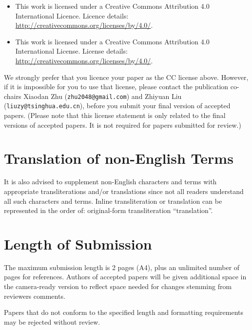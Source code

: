 \documentclass[11pt]{article}
\begin{document}
\begin{itemize}
    \item  This work is licensed under a Creative Commons Attribution 4.0 International Licence. Licence details: \url{http://creativecommons.org/licenses/by/4.0/}.
           
    \item This work is licensed under a Creative Commons Attribution 4.0 International License. License details: \url{http://creativecommons.org/licenses/by/4.0/}.
           
           
           
\end{itemize}

We strongly prefer that you licence your paper as the CC license
above. However, if it is impossible for you to use that license, please 
contact the publication co-chairs Xiaodan Zhu
(\texttt{zhu2048@gmail.com}) and Zhiyuan Liu (\texttt{liuzy@tsinghua.edu.cn}),
before you submit your final version of accepted papers. 
(Please note that this license statement is only related to the final versions of accepted papers. 
It is not required for papers submitted for review.)

\section{Translation of non-English Terms}

It is also advised to supplement non-English characters and terms
with appropriate transliterations and/or translations
since not all readers understand all such characters and terms.
Inline transliteration or translation can be represented in
the order of: original-form transliteration ``translation''.

\section{Length of Submission}
\label{sec:length}

The maximum submission length is 2 pages (A4), plus an unlimited number of pages for
references. Authors of accepted papers will be given additional space in
the camera-ready version to reflect space needed for changes stemming
from reviewers comments.

Papers that do not
conform to the specified length and formatting requirements may be
rejected without review.
\end{document}
